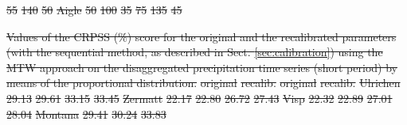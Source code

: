 \documentclass[hess, manuscript]{copernicus}
\providecommand{\DIFdel}[1]{{\protect\color{red}\sout{#1}}}                      %
\providecommand{\DIFdelFL}[1]{\DIFdel{#1}} %
\begin{document}
\begin{table}[htb]
\DIFdelFL{55 }%
\DIFdelFL{140 }%
\DIFdelFL{50}%
\DIFdelFL{Aigle }%
\DIFdelFL{50 }%
\DIFdelFL{100 }%
\DIFdelFL{35 }%
\DIFdelFL{75 }%
\DIFdelFL{135 }%
\DIFdelFL{45}%

{%
\DIFdelFL{Values of the CRPSS (\%) score for the original and the recalibrated parameters (with the sequential method, as described in Sect. \ref{sec:calibration}) using the MTW approach on the disaggregated precipitation time series (short period) by means of the proportional distribution.}}
\DIFdelFL{original }%
\DIFdelFL{recalib. }%
\DIFdelFL{original }%
\DIFdelFL{recalib. }%
\DIFdelFL{Ulrichen }%
\DIFdelFL{29.13 }%
\DIFdelFL{29.61 }%
\DIFdelFL{33.15 }%
\DIFdelFL{33.45 }%
\DIFdelFL{Zermatt }%
\DIFdelFL{22.17 }%
\DIFdelFL{22.80 }%
\DIFdelFL{26.72 }%
\DIFdelFL{27.43 }%
\DIFdelFL{Visp }%
\DIFdelFL{22.32 }%
\DIFdelFL{22.89 }%
\DIFdelFL{27.01 }%
\DIFdelFL{28.04 }%
\DIFdelFL{Montana }%
\DIFdelFL{29.41 }%
\DIFdelFL{30.24 }%
\DIFdelFL{33.83 }%

\end{table}
\end{document}
